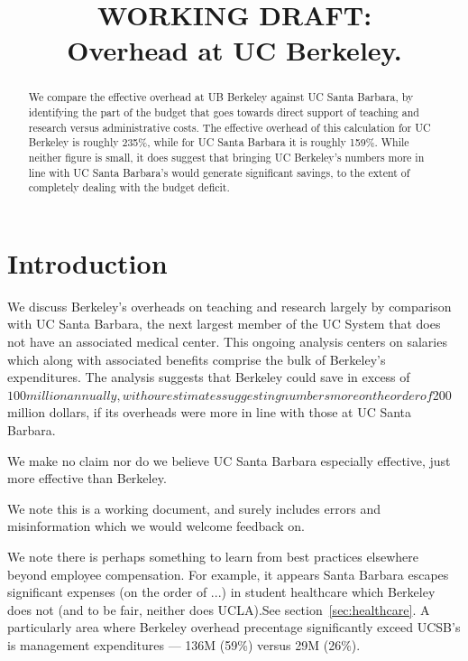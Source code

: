 \documentclass{article}
\title{{\bf WORKING DRAFT:}\\  Overhead at UC Berkeley.}
\author{}
\begin{document}
\maketitle

\begin{abstract}

We compare the effective overhead at UB Berkeley against UC Santa Barbara,
by identifying the part of the budget that goes towards direct support of teaching
and research versus administrative costs. The effective overhead of this calculation 
for UC Berkeley is roughly 235\%, while for UC Santa Barbara it is roughly 159\%. While neither 
figure is small, it does suggest that bringing UC Berkeley's numbers more in line 
with UC Santa Barbara's would generate significant savings, to the extent of 
completely dealing with the budget deficit.


\end{abstract}

\section{Introduction}

We discuss Berkeley's overheads on teaching and research largely by
comparison with UC Santa Barbara, the next largest member of the UC
System that does not have an associated medical center. This ongoing
analysis centers on salaries which along with associated benefits
comprise the bulk of Berkeley's expenditures. The analysis suggests
that Berkeley could save in excess of $100 million annually, with our 
estimates suggesting numbers more on the order of $200 million dollars,
if its overheads were more in line with those at UC Santa Barbara. 

We make no claim nor do we believe UC Santa Barbara especially
effective, just more effective than Berkeley. 

We note this is a working document, and surely includes errors and 
misinformation which we would welcome feedback on. 

We note there is perhaps something to learn from best practices
elsewhere beyond employee compensation. For example, it appears
Santa Barbara escapes significant expenses (on the order of ...) in student healthcare
which Berkeley does not (and to be fair, neither does UCLA).See
section~\ref{sec:healthcare}. A particularly area where Berkeley overhead precentage 
significantly exceed UCSB's is management expenditures --- 136M (59\%) versus 29M (26\%).
\end{document}
